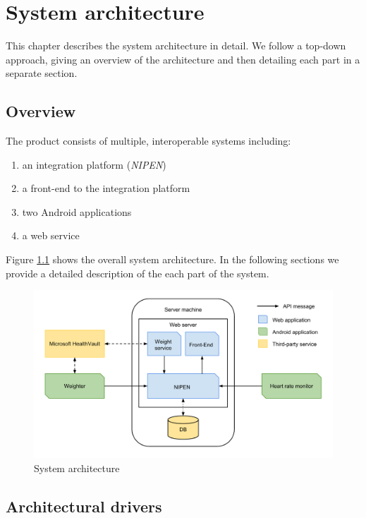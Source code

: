 \chapter{System architecture}
\label{ch:architecture}


This chapter describes the system architecture in detail.
We follow a top-down approach, giving an overview of the architecture and then detailing each part in a separate section.

\section{Overview}

The product consists of multiple, interoperable systems including:
\begin{enumerate}[1.]
	\item an integration platform (\textit{NIPEN})
	\item a front-end to the integration platform
	\item two Android applications
	\item a web service
\end{enumerate}

Figure \ref{figure:architecture} shows the overall system architecture.
In the following sections we provide a detailed description of the each part of the system.

\begin{figure}[h]
\centering
\includegraphics[scale=0.5]{../Figures/architecture.pdf}
\caption{System architecture}
\label{figure:architecture}
\end{figure}

\section{Architectural drivers}

